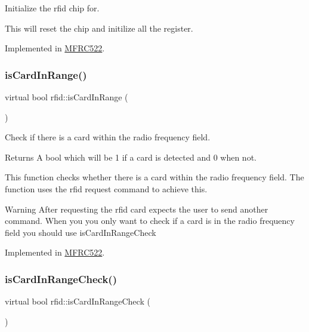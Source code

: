 Initialize the rfid chip for. 

This will reset the chip and initilize all the register. 

Implemented in \mbox{\hyperlink{class_m_f_r_c522_a5f589b09eaf150551b369052ce125fa1}{M\+F\+R\+C522}}.

\mbox{\label{classrfid_a23fc4ec0bc3790c5e68269d4f32771b9}} 
\subsubsection{\texorpdfstring{is\+Card\+In\+Range()}{isCardInRange()}}
{\footnotesize\ttfamily virtual bool rfid\+::is\+Card\+In\+Range (\begin{DoxyParamCaption}{ }\end{DoxyParamCaption})\hspace{0.3cm}{\ttfamily [pure virtual]}}



Check if there is a card within the radio frequency field. 

\begin{DoxyReturn}{Returns}
A bool which will be 1 if a card is detected and 0 when not.
\end{DoxyReturn}
This function checks whether there is a card within the radio frequency field. The function uses the rfid request command to achieve this. \begin{DoxyWarning}{Warning}
After requesting the rfid card expects the user to send another command. When you you only want to check if a card is in the radio frequency field you should use is\+Card\+In\+Range\+Check 
\end{DoxyWarning}


Implemented in \mbox{\hyperlink{class_m_f_r_c522_a019f76569bddf9c2f9f94eca13a618d7}{M\+F\+R\+C522}}.

\mbox{\label{classrfid_a9790d273f2385c8fb48bb85ca2aa0d10}} 
\subsubsection{\texorpdfstring{is\+Card\+In\+Range\+Check()}{isCardInRangeCheck()}}
{\footnotesize\ttfamily virtual bool rfid\+::is\+Card\+In\+Range\+Check (\begin{DoxyParamCaption}{ }\end{DoxyParamCaption})\hspace{0.3cm}{\ttfamily [pure virtual]}}



